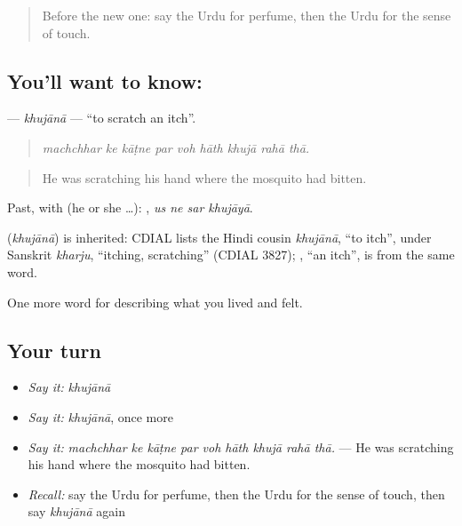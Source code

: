 \begin{quote}
Before the new one: say the Urdu for perfume, then the Urdu for the sense of touch.
\end{quote}

\subsection*{You'll want to know: }
\textbf{} — \emph{khujānā} — \textquotedblleft{}to scratch an itch\textquotedblright{}.

\begin{quote}
        
\end{quote}

\begin{quote}
\emph{machchhar ke kāṭne par voh hāth khujā rahā thā.}
\end{quote}

\begin{quote}
He was scratching his hand where the mosquito had bitten.
\end{quote}

Past, with  (he or she …):    , \emph{us ne sar khujāyā}.

\begin{cousinweb}
\textbf{} (\emph{khujānā}) is inherited: CDIAL lists the Hindi cousin \emph{khujānā}, \textquotedblleft{}to itch\textquotedblright{}, under Sanskrit \emph{kharju}, \textquotedblleft{}itching, scratching\textquotedblright{} (CDIAL 3827); \textbf{}, \textquotedblleft{}an itch\textquotedblright{}, is from the same word.
\end{cousinweb}

\begin{grammarlens}[title={What you've built}]
One more word for describing what you lived and felt.
\end{grammarlens}

\subsection*{Your turn}
\begin{itemize}
\raggedright
  \item \emph{Say it:} \emph{khujānā}
  \item \emph{Say it:} \emph{khujānā}, once more
  \item \emph{Say it:} \emph{machchhar ke kāṭne par voh hāth khujā rahā thā.} — He was scratching his hand where the mosquito had bitten.
  \item \emph{Recall:} say the Urdu for perfume, then the Urdu for the sense of touch, then say \emph{khujānā} again
\end{itemize}

